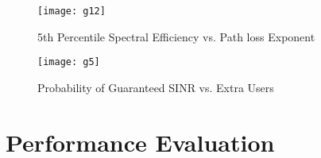 \documentclass[journal]{IEEEtran}
\begin{document}
\begin{figure}[!ht]
\begin{minipage}[t]{0.20\textwidth}
\centering
\texttt{[image: g12]}
\caption{\fontsize{6}{6}\selectfont 5th Percentile Spectral Efficiency vs. Path loss Exponent }
\label{g6}
\end{minipage}
\hspace{\fill}
\begin{minipage}[t]{0.26\textwidth}
\centering
\texttt{[image: g5]}
\caption{\fontsize{6}{6}\selectfont Probability of Guaranteed SINR vs. Extra Users }
\label{g7}
\end{minipage}
\end{figure}
\section{Performance Evaluation}
\end{document}
